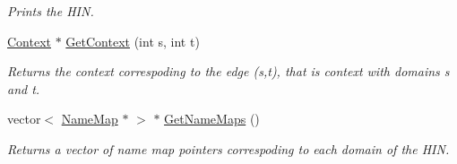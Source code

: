 \begin{DoxyCompactItemize}
\begin{DoxyCompactList}\small\item\em Prints the HIN. \item\end{DoxyCompactList}\item 
\hypertarget{class_relation_graph_aed7ec9b885e3f3cba079232e0a59b027}{
\hyperlink{class_context}{Context} $\ast$ \hyperlink{class_relation_graph_aed7ec9b885e3f3cba079232e0a59b027}{GetContext} (int s, int t)}
\label{class_relation_graph_aed7ec9b885e3f3cba079232e0a59b027}

\begin{DoxyCompactList}\small\item\em Returns the context correspoding to the edge (s,t), that is context with domains s and t. \item\end{DoxyCompactList}\item 
vector$<$ \hyperlink{class_name_map}{NameMap} $\ast$ $>$ $\ast$ \hyperlink{class_relation_graph_a79d93b2f1cb9226aa4a3fcbbe423588b}{GetNameMaps} ()
\begin{DoxyCompactList}\small\item\em Returns a vector of name map pointers correspoding to each domain of the HIN. \item\end{DoxyCompactList}\end{DoxyCompactItemize}
